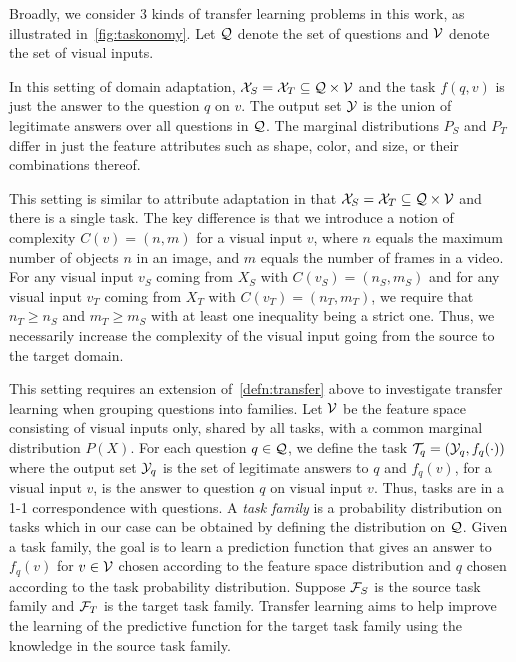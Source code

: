 Broadly, we consider 3 kinds of transfer learning problems in this work, as illustrated in~\cref{fig:taskonomy}. 
Let $\mathcal{Q}$ denote the set of questions and $\mathcal{V}$ denote the set of visual inputs.
\begin{description}
	\compresslist %
	\item[Feature Transfer:] In this setting of domain adaptation, $\mathcal{X}_S = \mathcal{X}_T \subseteq \mathcal{Q} \times \mathcal{V}$
	and the task $f(q,v)$ is just the answer to the question $q$ on $v$. The output set $\mathcal{Y}$ is the union of legitimate answers
	over all questions in $\mathcal{Q}$.
	The marginal distributions $P_S$ and $P_T$ differ in just the feature attributes such as shape, color, and size, or their combinations
	thereof.
	
	\item[Temporal Transfer:] This setting is similar to attribute adaptation in that $\mathcal{X}_S = \mathcal{X}_T \subseteq \mathcal{Q} \times \mathcal{V}$
	and there is a single task.
	The key difference is that we introduce a notion of complexity $C(v) = (n, m)$ for a visual input $v$,
	where $n$ equals the maximum number of objects $n$ in an image, and $m$
	equals  the number of frames in a video. 
	For any visual input $v_S$ coming from $X_S$ with $C(v_S) = (n_S, m_S)$
	and for any visual input $v_T$ coming from $X_T$ with $C(v_T) = (n_T, m_T)$, we require that $n_T \ge n_S$ and 
	$m_T \ge m_S$ with at least one inequality being a strict one. 
	Thus, we necessarily increase the complexity of the visual input going from the source to the target domain.
	
	\item[Reasoning Transfer:]
	This setting requires an extension of~\cref{defn:transfer} above to investigate transfer learning when
	grouping questions into families. Let $\mathcal{V}$ be the feature space consisting of visual inputs only, shared by
	all tasks, with a common marginal distribution $P(X)$. For each question $q \in \mathcal{Q}$, we define the task 
	$\mathcal{T}_q = (\mathcal{Y}_q, f_q(\cdot))$ where
	the output set $\mathcal{Y}_q$ is the set of legitimate answers to $q$ and $f_q(v)$, for a visual input $v$, 
	is the answer to question $q$ on visual input $v$.
	Thus, tasks are in a 1-1 correspondence with questions.
	A \emph{task family} is a probability distribution on tasks which in our case can be obtained by defining the distribution on $\mathcal{Q}$. 
	Given a task family, the goal is to learn a prediction function that gives an answer to $f_q(v)$ for $v \in \mathcal{V}$ chosen according 
	to the feature space distribution and $q$ chosen according to the task probability distribution.
	Suppose $\mathcal{F}_S$ is the source task family and $\mathcal{F}_T$ is the target task family.
	Transfer learning aims to help improve the learning of the predictive function for the target task family 
	using the knowledge in the source task family.
	
\end{description}


